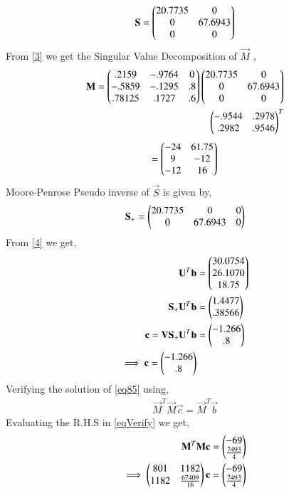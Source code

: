 \documentclass[journal,12pt,twocolumn]{IEEEtran}
\begin{document}
\begin{align}\label{eqS}
\mathbf{S}=\begin{pmatrix}20.7735&0\\0&67.6943\\0&0\end{pmatrix}
\end{align}
From \eqref{3} we get the Singular Value Decomposition of $\vec{M}$ ,
\begin{align}
\mathbf{M} = \begin{pmatrix}.2159&-.9764&0\\-.5859&-.1295&.8\\.78125&.1727&.6\end{pmatrix}\begin{pmatrix}20.7735&0\\0&67.6943\\0&0\end{pmatrix}\\\begin{pmatrix}-.9544&.2978\\.2982&.9546\end{pmatrix}^T
\end{align}
\begin{align}
=\begin{pmatrix}-24 & 61.75 \\ 9 & -12 \\ -12 & 16\end{pmatrix}    
\end{align}
Moore-Penrose Pseudo inverse of $\vec{S}$ is given by,
\begin{align}
\mathbf{S_+} = \begin{pmatrix}20.7735&0&0\\0&67.6943&0\end{pmatrix}
\end{align}
From \eqref{4} we get,
\begin{align}
\mathbf{U}^T\mathbf{b}&=\begin{pmatrix}30.0754\\26.1070\\18.75\end{pmatrix}\\
\mathbf{S_+}\mathbf{U}^T\mathbf{b}&=\begin{pmatrix}1.4477\\.38566\end{pmatrix}\\
\mathbf{c} = \mathbf{V}\mathbf{S_+}\mathbf{U}^T\mathbf{b} &= \begin{pmatrix}-1.266\\.8\end{pmatrix}\\
\implies\mathbf{c}=\begin{pmatrix}-1.266\\.8\end{pmatrix}\label{eq85}
\end{align}
Verifying the solution of \eqref{eq85} using,
\begin{align}
\vec{M}^T\vec{M}\vec{c} = \vec{M}^T\vec{b}\label{eqVerify}
\end{align}
Evaluating the R.H.S in \eqref{eqVerify} we get,
\begin{align}
\mathbf{M}^T\mathbf{M}\mathbf{c} &= \begin{pmatrix}-69\\\frac{7493}{4}\end{pmatrix}\\
\implies\begin{pmatrix}801&1182\\1182&\frac{67409}{16}\end{pmatrix}\mathbf{c} &= \begin{pmatrix}-69\\\frac{7493}{4}\end{pmatrix}\label{eq:eq17}
\end{align}
\end{document}
